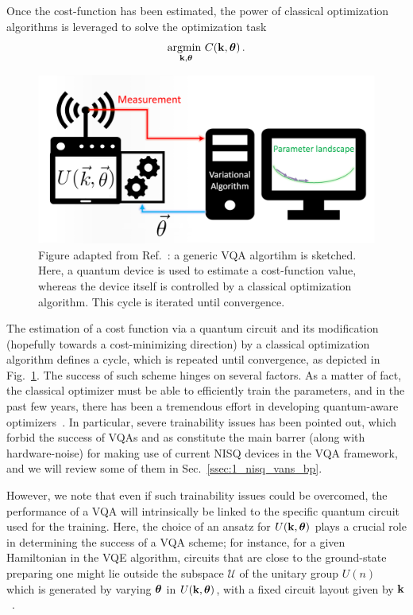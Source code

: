 Once the cost-function has been estimated, the power of classical optimization algorithms is leveraged to solve the optimization task
\begin{equation}\label{eq:optimization}
    \underset{\mathbf{k},\bm{\theta}}{\text{argmin }} C(\mathbf{k},\bm{\theta})\,.
\end{equation}
\begin{figure}[t!]
    \centering
    \includegraphics[width=1.\textwidth]{Figures/VANS/vqa_cycle.png}
    \caption{Figure adapted from Ref.~\cite{borrowed}: a generic VQA algortihm is sketched. Here, a quantum device is used to estimate a cost-function value, whereas the device itself is controlled by a classical optimization algorithm. This cycle is iterated until convergence.}
    \label{fig:VQAcycle}
\end{figure}
The estimation of a cost function via a quantum circuit and its modification (hopefully towards a cost-minimizing direction) by a classical optimization algorithm defines a cycle, which is repeated until convergence, as depicted in Fig.~\ref{fig:VQAcycle}. The success of such scheme hinges on several factors. As a matter of fact, the classical optimizer must be able to efficiently train the parameters, and in the past few years, there has been a tremendous effort in developing quantum-aware optimizers~\cite{verdon2018universal,kubler2020adaptive,arrasmith2020operator,stokes2020quantum,koczor2019quantum,nakanishi2020sequential,fontana2020optimizing}. In particular, severe trainability issues has been pointed out, which forbid the success of VQAs and as constitute the main barrer (along with hardware-noise) for making use of current NISQ devices in the VQA framework, and we will review some of them in Sec.~\ref{ssec:1_nisq_vans_bp}.

However, we note that even if such trainability issues could be overcomed, the performance of a VQA will intrinsically be linked to the specific quantum circuit used for the training. Here, the choice of an ansatz for $U(\mathbf{k},\bm{\theta})$ plays a crucial role in determining the success of a VQA scheme; for instance, for a given Hamiltonian in the VQE algorithm, circuits that are close to the ground-state preparing one might lie outside the subspace $\mathcal{U}$ of the unitary group $U(n)$ which is generated by varying $\bm{\theta}$ in $U(\mathbf{k}, \bm{\theta})$, with a fixed circuit layout given by $\mathbf{k}$~\cite{holmes2021connecting}.

